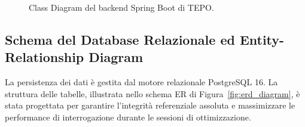 \begin{figure}[H]
    \caption{Class Diagram del backend Spring Boot di TEPO.}
    \label{fig:class_final}
\end{figure}

\subsection{Schema del Database Relazionale ed Entity-Relationship Diagram}
La persistenza dei dati è gestita dal motore relazionale PostgreSQL 16. La struttura delle tabelle, illustrata nello schema ER di Figura~\ref{fig:erd_diagram}, è stata progettata per garantire l'integrità referenziale assoluta e massimizzare le performance di interrogazione durante le sessioni di ottimizzazione.

